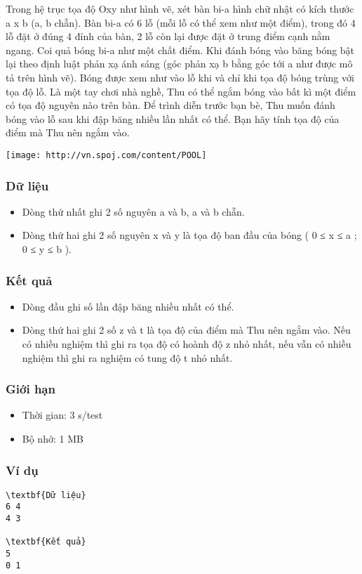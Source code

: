 



   Trong hệ trục tọa độ Oxy như hình vẽ, xét bàn bi-a hình chữ nhật có kích thước a x b (a, b chẵn). Bàn bi-a có 6 lỗ (mỗi lỗ có thể xem như một điểm), trong đó 4 lỗ đặt ở đúng 4 đỉnh của bàn, 2 lỗ còn lại được đặt ở trung điểm cạnh nằm ngang. Coi quả bóng bi-a như một chất điểm. Khi đánh bóng vào băng bóng bật lại theo định luật phản xạ ánh sáng (góc phản xạ  b bằng góc tới  a như được mô tả trên hình vẽ). Bóng được xem như vào lỗ khi và chỉ khi tọa độ bóng trùng với tọa độ lỗ. Là một tay chơi nhà nghề, Thu có thể ngắm bóng vào bất kì một điểm có tọa độ nguyên nào trên bàn. Để trình diễn trước bạn bè, Thu muốn đánh bóng vào lỗ sau khi đập băng nhiều lần nhất có thể. Bạn hãy tính tọa độ của điểm mà Thu nên ngắm vào.  


\texttt{[image: http://vn.spoj.com/content/POOL]}

\subsubsection{   Dữ liệu  }
\begin{itemize}
	\item     Dòng thứ nhất ghi 2 số nguyên a và b, a và b chẵn.   
	\item     Dòng thứ hai ghi 2 số nguyên x và y là tọa độ ban đầu của bóng ( 0 ≤ x ≤ a ; 0 ≤ y ≤ b ).   
\end{itemize}

\subsubsection{   Kết quả  }
\begin{itemize}
	\item     Dòng đầu ghi số lần đập băng nhiều nhất có thể.   
	\item     Dòng thứ hai ghi 2 số z và t là tọa độ của điểm mà Thu nên ngắm vào. Nếu có nhiều nghiệm thì ghi ra tọa độ có hoành độ z nhỏ nhất, nếu vẫn có nhiều nghiệm thì ghi ra nghiệm có tung độ t nhỏ nhất.   
\end{itemize}

\subsubsection{   Giới hạn  }
\begin{itemize}   Kích thước: 0 $<$ a, b ≤ 500   
	\item     Thời gian: 3 s/test   
	\item     Bộ nhớ: 1 MB   
\end{itemize}

\subsubsection{   Ví dụ  }
\begin{verbatim}
\textbf{Dữ liệu}
6 4
4 3	

\textbf{Kết quả}
5
0 1
\end{verbatim}